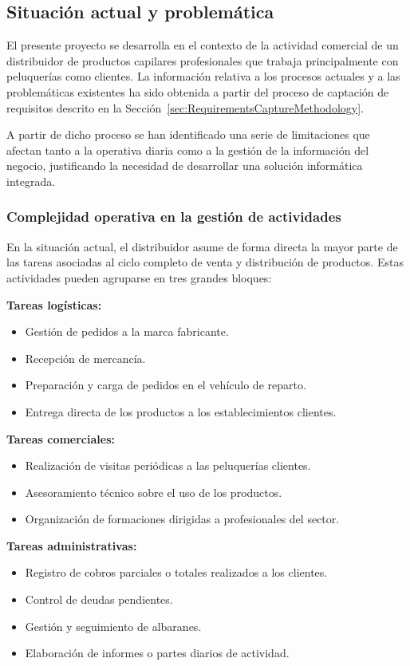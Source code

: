 \subsection{Situación actual y problemática}

El presente proyecto se desarrolla en el contexto de la actividad comercial de un distribuidor de productos capilares profesionales que trabaja principalmente con peluquerías como clientes. La información relativa a los procesos actuales y a las problemáticas existentes ha sido obtenida a partir del proceso de captación de requisitos descrito en la Sección~\ref{sec:RequirementsCaptureMethodology}.

A partir de dicho proceso se han identificado una serie de limitaciones que afectan tanto a la operativa diaria como a la gestión de la información del negocio, justificando la necesidad de desarrollar una solución informática integrada.

\subsubsection{Complejidad operativa en la gestión de actividades}

En la situación actual, el distribuidor asume de forma directa la mayor parte de las tareas asociadas al ciclo completo de venta y distribución de productos. Estas actividades pueden agruparse en tres grandes bloques:

\textbf{Tareas logísticas:}
\begin{itemize}
  \item Gestión de pedidos a la marca fabricante.
  \item Recepción de mercancía.
  \item Preparación y carga de pedidos en el vehículo de reparto.
  \item Entrega directa de los productos a los establecimientos clientes.
\end{itemize}

\textbf{Tareas comerciales:}
\begin{itemize}
  \item Realización de visitas periódicas a las peluquerías clientes.
  \item Asesoramiento técnico sobre el uso de los productos.
  \item Organización de formaciones dirigidas a profesionales del sector.
\end{itemize}

\textbf{Tareas administrativas:}
\begin{itemize}
  \item Registro de cobros parciales o totales realizados a los clientes.
  \item Control de deudas pendientes.
  \item Gestión y seguimiento de albaranes.
  \item Elaboración de informes o partes diarios de actividad.
\end{itemize}

